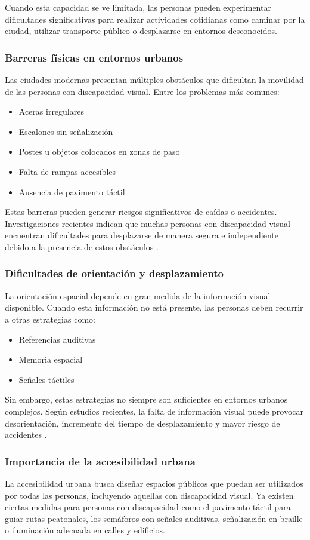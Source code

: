 Cuando esta capacidad se ve limitada, las personas pueden experimentar dificultades significativas para realizar actividades cotidianas como caminar por la ciudad, utilizar transporte público o desplazarse en entornos desconocidos.
\subsubsection{Barreras físicas en entornos urbanos}
Las ciudades modernas presentan múltiples obstáculos que dificultan la movilidad de las personas con discapacidad visual. Entre los problemas más comunes:
\begin{itemize}
    \item Aceras irregulares
    \item Escalones sin señalización
    \item Postes u objetos colocados en zonas de paso
    \item Falta de rampas accesibles
    \item Ausencia de pavimento táctil
\end{itemize}

Estas barreras pueden generar riesgos significativos de caídas o accidentes. Investigaciones recientes indican que muchas personas con discapacidad visual encuentran dificultades para desplazarse de manera segura e independiente debido a la presencia de estos obstáculos \cite{beyond_cane2022}.

\subsubsection{Dificultades de orientación y desplazamiento}
La orientación espacial depende en gran medida de la información visual disponible. Cuando esta información no está presente, las personas deben recurrir a otras estrategias como:
\begin{itemize}
    \item Referencias auditivas
    \item Memoria espacial
    \item Señales táctiles
\end{itemize}

Sin embargo, estas estrategias no siempre son suficientes en entornos urbanos complejos. Según estudios recientes, la falta de información visual puede provocar desorientación, incremento del tiempo de desplazamiento y mayor riesgo de accidentes \cite{beyond_cane2022}.
\subsubsection{Importancia de la accesibilidad urbana}
La accesibilidad urbana busca diseñar espacios públicos que puedan ser utilizados por todas las personas, incluyendo aquellas con discapacidad visual.
Ya existen ciertas medidas para personas con discapacidad como el pavimento táctil para guiar rutas peatonales, los semáforos con señales auditivas, señalización en braille o iluminación adecuada en calles y edificios.

